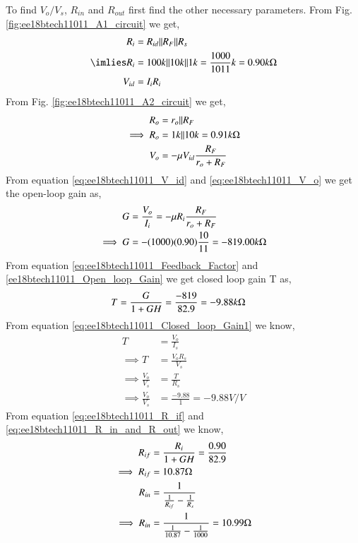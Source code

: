\begin{enumerate}[label=\thesection.\arabic*.,ref=\thesection.\theenumi]
\solution To find $V_{o}/V_{s}$, $R_{i n}$ and $R_{o u t}$ first find the other necessary parameters.
From Fig. \ref{fig:ee18btech11011_A1_circuit} we get,
%
\begin{align}
R_{i} &= R_{i d}\|R_{F}\|R_{s} 
\\
\label{ee18btech11011_R_i}
\imlies R_{i} &= 100k\|10k\|1k = \frac{1000}{1011}k = 0.90k\ohm
\\
\label{eq:ee18btech11011_V_id}
V_{i d} &= I_{i}R_{i}
\end{align}
%
From Fig. \ref{fig:ee18btech11011_A2_circuit} we get,
%
\begin{align}
R_{o} &= r_{o}\|R_{F}
\\
\label{ee18btech11011_R_o}
\implies R_{o} &= 1k\|10k = 0.91k\ohm
\\
\label{eq:ee18btech11011_V_o}
V_{o} &= -\mu V_{i d}\frac{R_{F}}{r_{o} + R_{F}}
\end{align}
%
From equation \ref{eq:ee18btech11011_V_id} and \ref{eq:ee18btech11011_V_o} we get the open-loop gain as,
%
\begin{align}
G &= \frac{V_{o}}{I_{i}} = -\mu R_{i}\frac{R_{F}}{r_{o} + R_{F}}
\\
\label{ee18btech11011_Open_loop_Gain}
\implies G &= -(1000)(0.90)\frac{10}{11} = -819.00k\ohm
\end{align}
%
From equation \ref{eq:ee18btech11011_Feedback_Factor} and \ref{ee18btech11011_Open_loop_Gain} we get closed loop gain T as,
%
\begin{align}
T &= \frac{G}{1+GH} = \frac{-819}{82.9} = -9.88k\ohm
\end{align}
%
From equation \ref{eq:ee18btech11011_Closed_loop_Gain1} we know,
\begin{align}
T &= \frac{V_{o}}{I_{s}}
\\
\implies T &= \frac{V_{o}R_{s}}{V_{s}}
\\
\implies \frac{V_{o}}{V_{s}} &= \frac{T}{R_{s}} 
\\
\implies \frac{V_{o}}{V_{s}} &= \frac{-9.88}{1} = -9.88V/V
\end{align}
From equation \ref{eq:ee18btech11011_R_if} and \ref{eq:ee18btech11011_R_in_and_R_out} we know,
%
\begin{align}
R_{i f} &= \frac{R_{i}}{1+GH} = \frac{0.90}{82.9}
\\
\implies R_{i f} &= 10.87\ohm
\\
R_{i n} &= \frac{1}{\frac{1}{R_{i f}} - \frac{1}{R_{s}}}
\\
\implies R_{i n} &= \frac{1}{\frac{1}{10.87} - \frac{1}{1000}} = 10.99\ohm

\end{align}
\end{enumerate}
